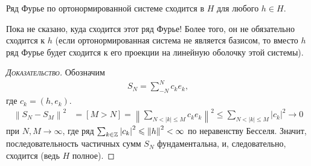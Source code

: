 \documentclass[../complex-analysis.tex]{subfiles}
\begin{document}
\begin{claim}
 \label{claim:fourier_series_convergence}
 Ряд Фурье по ортонормированной системе сходится в $ H $ для любого $ h \in H $.
\end{claim}

Пока не сказано, куда сходится этот ряд Фурье! Более того, он не обязательно сходится к $ h $ (если ортонормированная система не является базисом, то вместо $ h $ ряд Фурье будет сходится к его проекции на линейную оболочку этой системы).

\begin{proof}[\normalfont\textsc{Доказательство}]
 Обозначим
 \begin{align*}
  S_N = \sum_{-N}^{N} c_ke_k,
 \end{align*} где $ c_k = (h,e_k) $.
 \begin{align*}
  \left\| S_N-S_M \right\|^{2} &= [M > N] = \left\|\sum_{N < \left| k \right| \leqslant M} c_k e_k \right\|^{2} \leqslant \sum_{N < \left| k \right| \leqslant M} \left| c_k \right|^{2} \to 0
 \end{align*} при $ N,M \to \infty $, где ряд $ \sum_{k \in \mathbb{Z}} \left| c_k \right|^{2} \leqslant \left\| h \right\|^{2}  <  \infty $ по неравенству Бесселя. Значит, последовательность частичных сумм $ S_N $  фундаментальна, и, следовательно, сходится (ведь $ H $ полное).
\end{proof}
\end{document}
